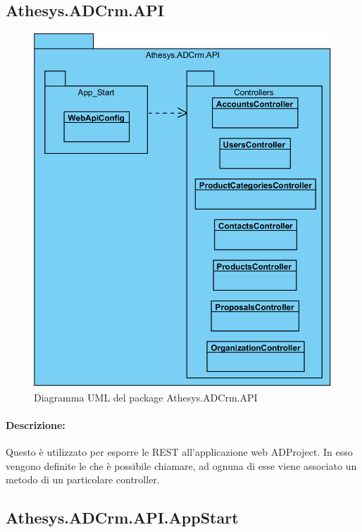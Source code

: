 \subsection{Athesys.ADCrm.API}
\begin{figure}[H]
	\centering
	\includegraphics[scale=1.1]{images/modules/API}
	\caption{Diagramma UML del package Athesys.ADCrm.API}
	\label{fig:api}
\end{figure}
\paragraph{Descrizione:} 
Questo  è utilizzato per esporre le  REST all'applicazione web ADProject. In esso vengono definite le  che è possibile chiamare, ad ognuna di esse viene associato un metodo di un particolare controller. 





\subsection{Athesys.ADCrm.API.AppStart}
